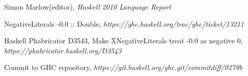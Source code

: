 \documentclass[fontsize=14pt, paper=a4, pagesize, DIV=calc]{scrartcl}
\begin{document}
\tableofcontents

\clearpage



\clearpage







\clearpage

\begin{thebibliography}{9}

Simon Marlow(editor),
\emph{Haskell 2010 Language Report}

NegativeLiterals -0.0 :: Double,
\emph{https://ghc.haskell.org/trac/ghc/ticket/13211}

Haskell Phabricator D3543,
Make XNegativeLiterals treat -0.0 as negative 0,
\emph{https://phabricator.haskell.org/D3543}

Commit to GHC repository,
\emph{https://git.haskell.org/ghc.git/commitdiff/0279b}

\end{thebibliography}
\end{document}
